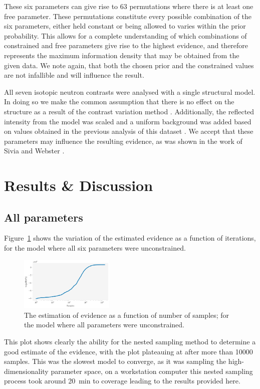 \documentclass[
 reprint,
 superscriptaddress,
 amsmath,amssymb,
 aps,
]{revtex4-2}
\begin{document}
%
These six parameters can give rise to \num{63} permutations where there is at least one free parameter. 
These permutations constitute every possible combination of the six parameters, either held constant or being allowed to varies within the prior probability. 
This allows for a complete understanding of which combinations of constrained and free parameters give rise to the highest evidence, and therefore represents the maximum information density that may be obtained from the given data.
We note again, that both the chosen prior and the constrained values are not infallible and will influence the result. 

All seven isotopic neutron contrasts were analysed with a single structural model. 
In doing so we make the common assumption that there is no effect on the structure as a result of the contrast variation method \cite{nelson_motofit_2006}. 
Additionally, the reflected intensity from the model was scaled and a uniform background was added based on values obtained in the previous analysis of this dataset \cite{mccluskey_assessing_2019}. 
We accept that these parameters may influence the resulting evidence, as was shown in the work of Sivia and Webster \cite{sivia_bayesian_1998}.

\section{\label{results} Results \& Discussion}

\subsection{All parameters}
Figure~\ref{fig:iterations} shows the variation of the estimated evidence as a function of iterations, for the model where all six parameters were unconstrained.
%
\begin{figure}
\includegraphics[width=0.4\textwidth]{iterations}
\caption{\label{fig:iterations} The estimation of evidence as a function of number of samples; for the model where all parameters were unconstrained.}
\end{figure}
%
This plot shows clearly the ability for the nested sampling method to determine a good estimate of the evidence, with the plot plateauing at \unskip\;after more than \num{10000} samples.
This was the slowest model to converge, as it was sampling the high-dimensionality parameter space, on a workstation computer this nested sampling process took around \SI{20}{\minute} to coverage leading to the results provided here.
\end{document}
